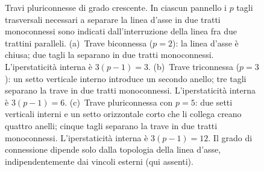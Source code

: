 \begin{figure}[!htbp]
{\begin{tikzpicture}[
			>=stealth, line width=0.8pt,
			trave/.style={line width=1.6pt, line cap=round,
				line join=round, black},
			taglio/.style={line width=0.7pt, black}]
		\end{tikzpicture}
	}
	\caption{Travi pluriconnesse di grado crescente. In
		ciascun pannello i $p$ tagli trasversali necessari
		a separare la linea d'asse in due tratti
		monoconnessi sono indicati dall'interruzione della
		linea fra due trattini paralleli.
		(a)~Trave biconnessa ($p = 2$): la linea
		d'asse è chiusa; due tagli la separano in due
		tratti monoconnessi. L'iperstaticità interna è
		$3(p-1) = 3$.
		(b)~Trave triconnessa ($p = 3$): un setto
		verticale interno introduce un secondo anello;
		tre tagli separano la trave in due tratti
		monoconnessi. L'iperstaticità interna è
		$3(p-1) = 6$.
		(c)~Trave pluriconnessa con $p = 5$: due setti
		verticali interni e un setto orizzontale corto
		che li collega creano quattro anelli; cinque
		tagli separano la trave in due tratti monoconnessi.
		L'iperstaticità interna è $3(p-1) = 12$.
		Il grado di connessione dipende solo dalla
		topologia della linea d'asse, indipendentemente
		dai vincoli esterni (qui assenti).}
	\label{fig:gradi_connessione}
\end{figure}
